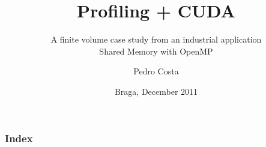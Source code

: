 \documentclass{beamer}
\title{Profiling + CUDA}
\subtitle{A finite volume case study from an industrial application\\\smaller Shared Memory with OpenMP}
\author{Pedro Costa}
\institute[pg19830]{
	Universidade do Minho
}
\date{Braga, December 2011}
\begin{document}

\maketitle%

\begin{frame}
	\frametitle{Index}
	\tableofcontents
\end{frame}

%
\end{document}
